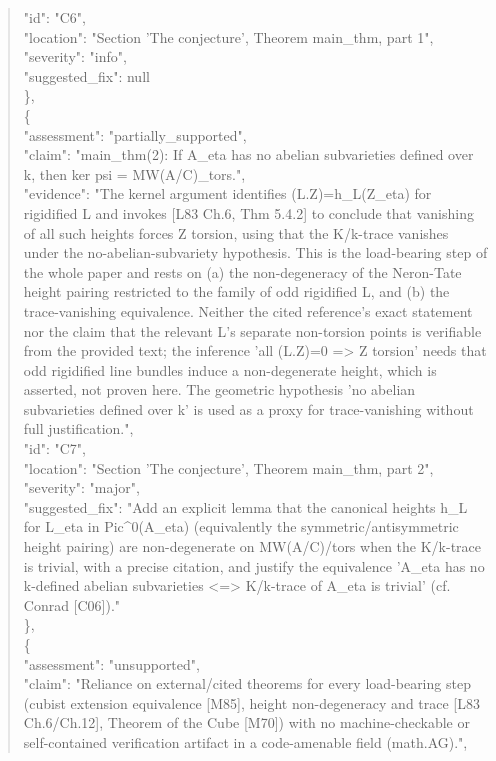 \documentclass[11pt]{article}
\begin{document}
\begin{quote}
      "id": "C6",\\
      "location": "Section 'The conjecture', Theorem main\_thm, part 1",\\
      "severity": "info",\\
      "suggested\_fix": null\\
    \},\\
    \{\\
      "assessment": "partially\_supported",\\
      "claim": "main\_thm(2): If A\_eta has no abelian subvarieties defined over k, then ker psi = MW(A/C)\_tors.",\\
      "evidence": "The kernel argument identifies (L.Z)=h\_L(Z\_eta) for rigidified L and invokes [L83 Ch.6, Thm 5.4.2] to conclude that vanishing of all such heights forces Z torsion, using that the K/k-trace vanishes under the no-abelian-subvariety hypothesis. This is the load-bearing step of the whole paper and rests on (a) the non-degeneracy of the Neron-Tate height pairing restricted to the family of odd rigidified L, and (b) the trace-vanishing equivalence. Neither the cited reference's exact statement nor the claim that the relevant L's separate non-torsion points is verifiable from the provided text; the inference 'all (L.Z)=0 => Z torsion' needs that odd rigidified line bundles induce a non-degenerate height, which is asserted, not proven here. The geometric hypothesis 'no abelian subvarieties defined over k' is used as a proxy for trace-vanishing without full justification.",\\
      "id": "C7",\\
      "location": "Section 'The conjecture', Theorem main\_thm, part 2",\\
      "severity": "major",\\
      "suggested\_fix": "Add an explicit lemma that the canonical heights h\_L for L\_eta in Pic\^{}0(A\_eta) (equivalently the symmetric/antisymmetric height pairing) are non-degenerate on MW(A/C)/tors when the K/k-trace is trivial, with a precise citation, and justify the equivalence 'A\_eta has no k-defined abelian subvarieties <=> K/k-trace of A\_eta is trivial' (cf. Conrad [C06])."\\
    \},\\
    \{\\
      "assessment": "unsupported",\\
      "claim": "Reliance on external/cited theorems for every load-bearing step (cubist extension equivalence [M85], height non-degeneracy and trace [L83 Ch.6/Ch.12], Theorem of the Cube [M70]) with no machine-checkable or self-contained verification artifact in a code-amenable field (math.AG).",\\

\end{quote}
\end{document}
